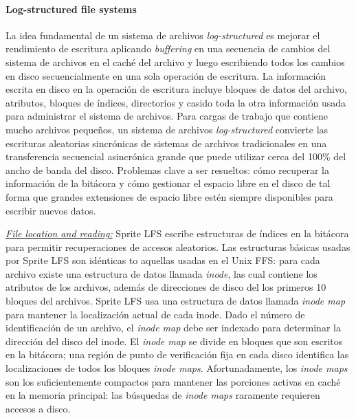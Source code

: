 \paragraph{\textnormal{\textbf{Log-structured file systems}}}
La idea fundamental de un sistema de archivos \emph{log-structured} es mejorar el rendimiento de escritura aplicando \emph{buffering} en una secuencia de cambios del sistema de archivos en el caché del archivo y luego escribiendo todos los cambios en disco secuencialmente en una sola operación de escritura. La información escrita en disco en la operación de escritura incluye bloques de datos del archivo, atributos, bloques de índices, directorios y casido toda la otra información usada para administrar el sistema de archivos. Para cargas de trabajo que contiene mucho archivos pequeños, un sistema de archivos \emph{log-structured} convierte las escrituras aleatorias sincrónicas de sistemas de archivos tradicionales en una transferencia secuencial asincrónica grande que puede utilizar cerca del 100\% del ancho de banda del disco. Problemas clave a ser resueltos: cómo recuperar la información de la bitácora y cómo gestionar el espacio libre en el disco de tal forma que grandes extensiones de espacio libre estén siempre disponibles para escribir nuevos datos. 

\underline{\emph{File location and reading:}} Sprite LFS escribe estructuras de índices en la bitácora para permitir recuperaciones de accesos aleatorios. Las estructuras básicas usadas por Sprite LFS son idénticas to aquellas usadas en el Unix FFS: para cada archivo existe una estructura de datos llamada \emph{inode}, las cual contiene los atributos de los archivos, además de direcciones de disco del los primeros 10 bloques del archivos. Sprite LFS usa una estructura de datos llamada \emph{inode map} para mantener la localización actual de cada inode. Dado el número de identificación de un archivo, el \emph{inode map} debe ser indexado para determinar la dirección del disco del inode. El \emph{inode map} se divide en bloques que son escritos en la bitácora; una región de punto de verificación fija en cada disco identifica las localizaciones de todos los bloques \emph{inode maps}. Afortunadamente, los \emph{inode maps} son los suficientemente compactos para mantener las porciones activas en caché en la memoria principal: las búsquedas de \emph{inode maps} raramente requieren accesos a disco. 

